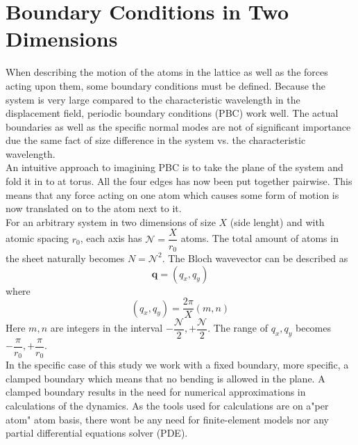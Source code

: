 
\appendix
\appendixpage
\addappheadtotoc
\section{Boundary Conditions in Two Dimensions}
When describing the motion of the atoms in the lattice as well as the forces acting upon them, some boundary conditions must be defined. Because the system is very large compared to the characteristic wavelength in the displacement field, periodic boundary conditions (PBC) work well. The actual boundaries as well as the specific normal modes are not of significant importance due the same fact of size difference in the system vs. the characteristic wavelength. \\
An intuitive approach to imagining PBC is to take the plane of the system and fold it in to at torus. All the four edges has now been put together pairwise. This means that any force acting on one atom which causes some form of motion is now translated on to the atom next to it.\\
For an arbitrary system in two dimensions of size $X$ (side lenght) and with atomic spacing $r_{0}$, each axis has $\mathcal{N}=\dfrac{X}{r_{0}}$ atoms. The total amount of atoms in the sheet naturally becomes $N=\mathcal{N}^{2}$. The Bloch wavevector can be described as
\begin{equation}
     \mathbf{q}=(q_{x},q_{y})
\end{equation}
where
\begin{equation}
     (q_{x},q_{y})=\dfrac{2\pi}{X}(m,n)
\end{equation}
Here $m,n$ are integers in the interval $-\dfrac{\mathcal{N}}{2}, +\dfrac{\mathcal{N}}{2}$. The range of $q_{x},q_{y}$ becomes $-\dfrac{\pi}{r_{0}},+\dfrac{\pi}{r_{0}}$.\\
In the specific case of this study we work with a fixed boundary, more specific, a clamped boundary which means that no bending is allowed in the plane. A clamped boundary results in the need for numerical approximations in calculations of the dynamics. As the tools used for calculations are on a"per atom" atom basis, there wont be any need for finite-element models nor any partial differential equations solver (PDE).

